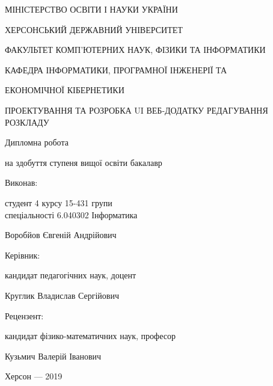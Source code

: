 \thispagestyle{empty}

{\centering
МІНІСТЕРСТВО ОСВІТИ І НАУКИ УКРАЇНИ

ХЕРСОНСЬКИЙ ДЕРЖАВНИЙ УНІВЕРСИТЕТ

ФАКУЛЬТЕТ КОМП'ЮТЕРНИХ НАУК, ФІЗИКИ ТА ІНФОРМАТИКИ

КАФЕДРА ІНФОРМАТИКИ, ПРОГРАМНОЇ ІНЖЕНЕРІЇ ТА 

ЕКОНОМІЧНОЇ КІБЕРНЕТИКИ

\vfill

ПРОЕКТУВАННЯ ТА РОЗРОБКА UI ВЕБ-ДОДАТКУ РЕДАГУВАННЯ РОЗКЛАДУ

Дипломна робота

на здобуття ступеня вищої освіти бакалавр

}

\vfill

\hfill\begin{minipage}[t]{0.65\textwidth}
Виконав: 

студент 4 курсу 15-431 групи \\ спеціальності 6.040302  Інформатика

Воробйов Євгеній Андрійович

Керівник:

кандидат педагогічних наук, доцент

Круглик Владислав Сергійович

Рецензент:

кандидат фізико-математичних наук, професор

Кузьмич Валерій Іванович


\end{minipage}

\vfill

{\centering
Херсон --- 2019

}